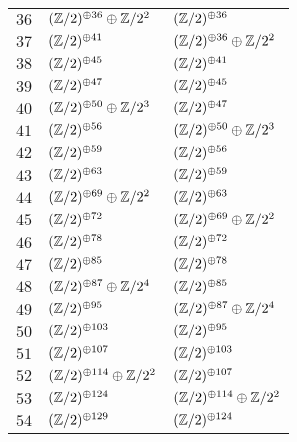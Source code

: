 \begin{supertabular}{|c|p{5.5cm}|p{5.5cm}|}
$36$%
&$(\mathbb{Z}/2)^{\oplus36}\oplus\mathbb{Z}/2^{2}$%
&$(\mathbb{Z}/2)^{\oplus36}$\\

$37$%
&$(\mathbb{Z}/2)^{\oplus41}$%
&$(\mathbb{Z}/2)^{\oplus36}\oplus\mathbb{Z}/2^{2}$\\

$38$%
&$(\mathbb{Z}/2)^{\oplus45}$%
&$(\mathbb{Z}/2)^{\oplus41}$\\

$39$%
&$(\mathbb{Z}/2)^{\oplus47}$%
&$(\mathbb{Z}/2)^{\oplus45}$\\

$40$%
&$(\mathbb{Z}/2)^{\oplus50}\oplus\mathbb{Z}/2^{3}$%
&$(\mathbb{Z}/2)^{\oplus47}$\\

$41$%
&$(\mathbb{Z}/2)^{\oplus56}$%
&$(\mathbb{Z}/2)^{\oplus50}\oplus\mathbb{Z}/2^{3}$\\

$42$%
&$(\mathbb{Z}/2)^{\oplus59}$%
&$(\mathbb{Z}/2)^{\oplus56}$\\

$43$%
&$(\mathbb{Z}/2)^{\oplus63}$%
&$(\mathbb{Z}/2)^{\oplus59}$\\

$44$%
&$(\mathbb{Z}/2)^{\oplus69}\oplus\mathbb{Z}/2^{2}$%
&$(\mathbb{Z}/2)^{\oplus63}$\\

$45$%
&$(\mathbb{Z}/2)^{\oplus72}$%
&$(\mathbb{Z}/2)^{\oplus69}\oplus\mathbb{Z}/2^{2}$\\

$46$%
&$(\mathbb{Z}/2)^{\oplus78}$%
&$(\mathbb{Z}/2)^{\oplus72}$\\

$47$%
&$(\mathbb{Z}/2)^{\oplus85}$%
&$(\mathbb{Z}/2)^{\oplus78}$\\

$48$%
&$(\mathbb{Z}/2)^{\oplus87}\oplus\mathbb{Z}/2^{4}$%
&$(\mathbb{Z}/2)^{\oplus85}$\\

$49$%
&$(\mathbb{Z}/2)^{\oplus95}$%
&$(\mathbb{Z}/2)^{\oplus87}\oplus\mathbb{Z}/2^{4}$\\

$50$%
&$(\mathbb{Z}/2)^{\oplus103}$%
&$(\mathbb{Z}/2)^{\oplus95}$\\

$51$%
&$(\mathbb{Z}/2)^{\oplus107}$%
&$(\mathbb{Z}/2)^{\oplus103}$\\

$52$%
&$(\mathbb{Z}/2)^{\oplus114}\oplus\mathbb{Z}/2^{2}$%
&$(\mathbb{Z}/2)^{\oplus107}$\\

$53$%
&$(\mathbb{Z}/2)^{\oplus124}$%
&$(\mathbb{Z}/2)^{\oplus114}\oplus\mathbb{Z}/2^{2}$\\

$54$%
&$(\mathbb{Z}/2)^{\oplus129}$%
&$(\mathbb{Z}/2)^{\oplus124}$\\


\end{supertabular}
